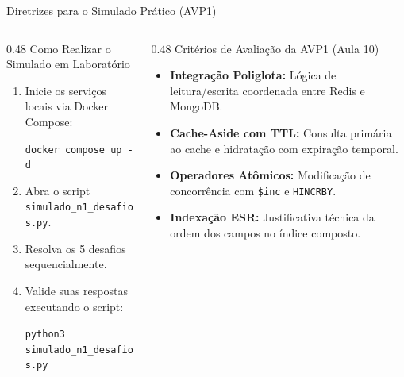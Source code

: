 \begin{frame}[fragile]{Diretrizes para o Simulado Prático (AVP1)}
  \vspace{0.1cm}
  \begin{columns}[t,onlytextwidth]
    \begin{column}{0.48\textwidth}
      \alert{Como Realizar o Simulado em Laboratório}\par
      \footnotesize
      \begin{enumerate}
        \item Inicie os serviços locais via Docker Compose:
          \par\vspace{0.08cm}
          \centering
          \lstinline[language=mongosh, basicstyle=\scriptsize\ttfamily]|docker compose up -d|
          \par\vspace{0.08cm}
          \raggedright
        \item Abra o script \texttt{simulado\_n1\_desafios.py}.
        \item Resolva os 5 desafios sequencialmente.
        \item Valide suas respostas executando o script:
          \par\vspace{0.08cm}
          \centering
          \lstinline[language=mongosh, basicstyle=\scriptsize\ttfamily]|python3 simulado_n1_desafios.py|
          \par\vspace{0.08cm}
          \raggedright
      \end{enumerate}
    \end{column}
    
    \begin{column}{0.48\textwidth}
      \alert{Critérios de Avaliação da AVP1 (Aula 10)}\par
      \footnotesize
      \begin{itemize}
        \item \textbf{Integração Poliglota:} Lógica de leitura/escrita coordenada entre Redis e MongoDB.
        \item \textbf{Cache-Aside com TTL:} Consulta primária ao cache e hidratação com expiração temporal.
        \item \textbf{Operadores Atômicos:} Modificação de concorrência com \lstinline[language=mongosh, basicstyle=\footnotesize\ttfamily]|$inc| e \lstinline[language=rediscli, basicstyle=\footnotesize\ttfamily]|HINCRBY|.
        \item \textbf{Indexação ESR:} Justificativa técnica da ordem dos campos no índice composto.
      \end{itemize}
    \end{column}
  \end{columns}
\end{frame}

